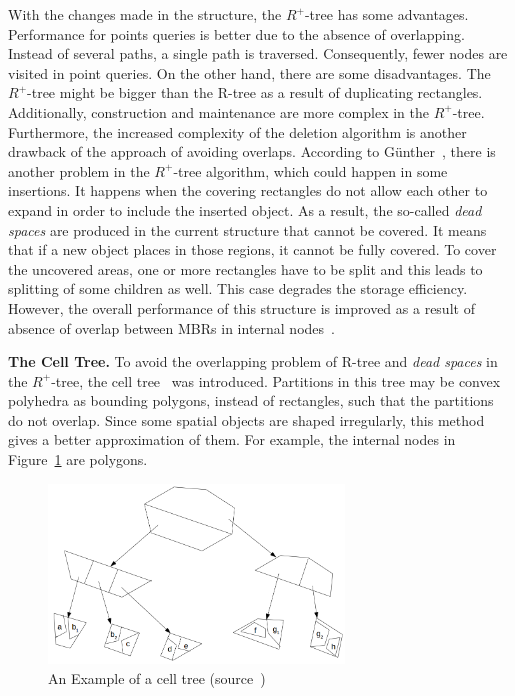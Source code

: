 \documentclass[a4paper,12pt]{article}
\begin{document}
With the changes made in the structure, the $R^+$-tree has some advantages. Performance for points
queries is better due to the absence of overlapping. Instead of several paths, a single path is traversed. Consequently, fewer nodes are visited in point queries. On the other hand, there are some disadvantages. 
The {$R^+$-tree} might be bigger than the R-tree as a result of duplicating rectangles. Additionally, construction and maintenance are more complex in the {$R^+$-tree}. Furthermore, the increased complexity of the deletion algorithm is another drawback of the approach of avoiding overlaps. 
According to G{\"u}nther~\cite{efficientstruct}, there is another problem in the {$R^+$-tree} algorithm, which could happen in some insertions. It happens when the covering rectangles do not allow each other to expand in order to include the inserted object. As a result, the so-called \textit{dead spaces} are produced in the current structure that cannot be covered. It means that if a new object places in those regions, it cannot be fully covered. To cover the uncovered areas, one or more rectangles have to be split and this leads to splitting of some children as well. This case degrades the storage efficiency. %
However, the overall performance of this structure is improved as a result of absence of overlap between MBRs in internal nodes~\cite{Papadopoulos2010}.

\textbf{The Cell Tree.}
To avoid the overlapping problem of R-tree and \textit{dead spaces} in the $R^+$-tree, the cell tree~\cite{celltree} was introduced. Partitions in this tree may be convex polyhedra as bounding polygons, instead of rectangles, such that the partitions do not overlap. 
Since some spatial objects are shaped irregularly, this method gives a better approximation of them.
For example, the internal nodes in Figure~\ref{figcelltree} are polygons. 
\begin{figure}
\centering
\includegraphics[width=0.7\textwidth,height=0.19\textheight]{CellTree}
\caption{An Example of a cell tree (source~\cite{survey})}
\label{figcelltree}
\end{figure} 
\end{document}
